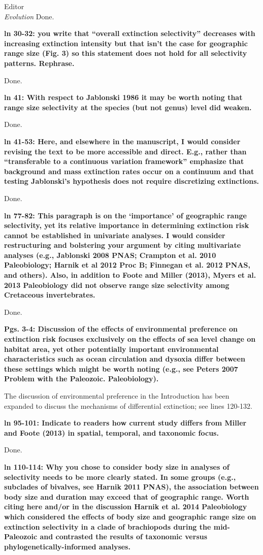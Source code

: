 \documentclass{letter}
\begin{document}
\begin{letter}{Editor \\ \textit{Evolution}}
  Done.

  \textbf{ln 30-32: you write that “overall extinction selectivity” decreases with increasing extinction intensity but that isn’t the case for geographic range size (Fig. 3) so this statement does not hold for all selectivity patterns. Rephrase.}

  Done.

  \textbf{ln 41: With respect to Jablonski 1986 it may be worth noting that range size selectivity at the species (but not genus) level did weaken.}

  Done.

  \textbf{ln 41-53: Here, and elsewhere in the manuscript, I would consider revising the text to be more accessible and direct. E.g., rather than “transferable to a continuous variation framework” emphasize that background and mass extinction rates occur on a continuum and that testing Jablonski’s hypothesis does not require discretizing extinctions.}

  Done.

  \textbf{ln 77-82: This paragraph is on the ‘importance’ of geographic range selectivity, yet its relative importance in determining extinction risk cannot be established in univariate analyses. I would consider restructuring and bolstering your argument by citing multivariate analyses (e.g., Jablonski 2008 PNAS; Crampton et al. 2010 Paleobiology; Harnik et al 2012 Proc B; Finnegan et al. 2012 PNAS, and others). Also, in addition to Foote and Miller (2013), Myers et al. 2013 Paleobiology did not observe range size selectivity among Cretaceous invertebrates.}

  Done.

  \textbf{Pgs. 3-4: Discussion of the effects of environmental preference on extinction risk focuses exclusively on the effects of sea level change on habitat area, yet other potentially important environmental characteristics such as ocean circulation and dysoxia differ between these settings which might be worth noting (e.g., see Peters 2007 Problem with the Paleozoic. Paleobiology).}

  The discussion of environmental preference in the Introduction has been expanded to discuss the mechanisms of differential extinction; see lines 120-132.


  \textbf{ln 95-101: Indicate to readers how current study differs from Miller and Foote (2013) in spatial, temporal, and taxonomic focus.}

  Done.

  \textbf{ln 110-114: Why you chose to consider body size in analyses of selectivity needs to be more clearly stated. In some groups (e.g., subclades of bivalves, see Harnik 2011 PNAS), the association between body size and duration may exceed that of geographic range. Worth citing here and/or in the discussion Harnik et al. 2014 Paleobiology which considered the effects of body size and geographic range size on extinction selectivity in a clade of brachiopods during the mid-Paleozoic and contrasted the results of taxonomic versus phylogenetically-informed analyses.}


\end{letter}
\end{document}
